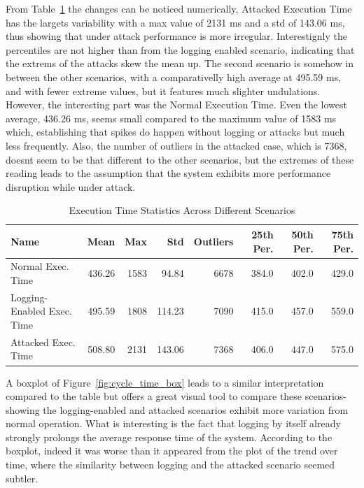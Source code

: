 \documentclass[Master,BMR,english]{twbook}
\begin{document}
From Table~\ref{tab:exec_time_stats} the changes can be noticed numerically, Attacked Execution Time has the largets variability with a max value of 2131 ms and a std of 143.06 ms, thus showing that under attack performance is more irregular. Interestignly the percentiles are not higher than from the logging enabled scenario, indicating that the extrems of the attacks skew the mean up. The second scenario is somehow in between the other scenarios, with a comparativelly high average at 495.59 ms, and with fewer extreme values, but it features much slighter undulations. However, the interesting part was the Normal Execution Time. Even the lowest average, 436.26 ms, seems small compared to the maximum value of 1583 ms which, establishing that spikes do happen without logging or attacks but much less frequently. Also, the number of outliers in the attacked case, which is 7368, doesnt seem to be that different to the other scenarios, but the extremes of these reading leads to the assumption that the system exhibits more performance disruption while under attack. 


\begin{table}[!htbp]
\centering
\begin{tabular}{|p{3cm}|r|r|r|r|r|r|r|}
\hline
\textbf{Name} & \textbf{Mean} & \textbf{Max} & \textbf{Std} & \textbf{Outliers} & \textbf{25th Per.} & \textbf{50th Per.} & \textbf{75th Per.} \\ \hline
Normal Exec. Time & 436.26 & 1583 & 94.84 & 6678 & 384.0 & 402.0 & 429.0 \\ \hline
Logging-Enabled Exec. Time & 495.59 & 1808 & 114.23 & 7090 & 415.0 & 457.0 & 559.0 \\ \hline
Attacked Exec. Time & 508.80 & 2131 & 143.06 & 7368 & 406.0 & 447.0 & 575.0 \\ \hline
\end{tabular}
\caption{Execution Time Statistics Across Different Scenarios}
\label{tab:exec_time_stats}
\end{table}



A boxplot of Figure~\ref{fig:cycle_time_box} leads to a similar interpretation compared to the table but offers a great visual tool to compare these scenarios-showing the logging-enabled and attacked scenarios exhibit more variation from normal operation. What is interesting is the fact that logging by itself already strongly prolongs the average response time of the system. According to the boxplot, indeed it was worse than it appeared from the plot of the trend over time, where the similarity between logging and the attacked scenario seemed subtler. 
\end{document}
